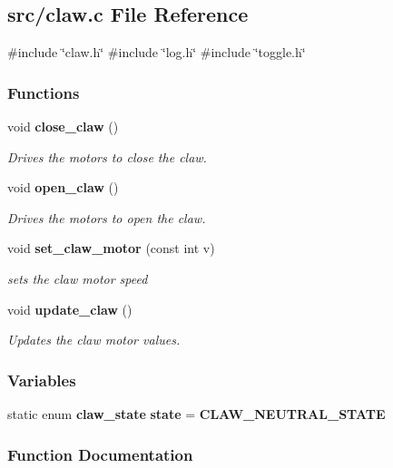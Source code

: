 \subsection{src/claw.c File Reference}
\label{claw_8c}
{\ttfamily \#include \char`\"{}claw.\+h\char`\"{}}\newline
{\ttfamily \#include \char`\"{}log.\+h\char`\"{}}\newline
{\ttfamily \#include \char`\"{}toggle.\+h\char`\"{}}\newline
\subsubsection*{Functions}
\begin{DoxyCompactItemize}
\item 
void \textbf{ close\+\_\+claw} ()
\begin{DoxyCompactList}\small\item\em Drives the motors to close the claw. \end{DoxyCompactList}\item 
void \textbf{ open\+\_\+claw} ()
\begin{DoxyCompactList}\small\item\em Drives the motors to open the claw. \end{DoxyCompactList}\item 
void \textbf{ set\+\_\+claw\+\_\+motor} (const int v)
\begin{DoxyCompactList}\small\item\em sets the claw motor speed \end{DoxyCompactList}\item 
void \textbf{ update\+\_\+claw} ()
\begin{DoxyCompactList}\small\item\em Updates the claw motor values. \end{DoxyCompactList}\end{DoxyCompactItemize}
\subsubsection*{Variables}
\begin{DoxyCompactItemize}
\item 
static enum \textbf{ claw\+\_\+state} \textbf{ state} = \textbf{ C\+L\+A\+W\+\_\+\+N\+E\+U\+T\+R\+A\+L\+\_\+\+S\+T\+A\+TE}
\end{DoxyCompactItemize}


\subsubsection{Function Documentation}
\mbox{\label{claw_8c_ac42dd40dbb37219295286859c6b068c2}} 
